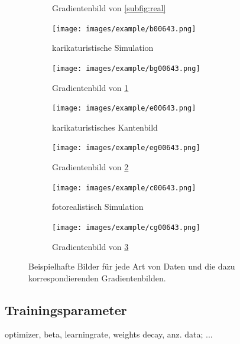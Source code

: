 \begin{figure}[htp]
\begin{subfigure}[b]{0.48\linewidth}
		\caption{Gradientenbild von \ref{subfig:real}}
	\end{subfigure}
	\hfill
	\begin{subfigure}[b]{0.48\linewidth}
		\centering
		\texttt{[image: images/example/b00643.png]}
		\caption{karikaturistische Simulation}
		\label{subfig:cartoonish}
	\end{subfigure}
	\hfill
	\begin{subfigure}[b]{0.48\linewidth}
		\centering
		\texttt{[image: images/example/bg00643.png]}
		\caption{Gradientenbild von \ref{subfig:cartoonish}}
	\end{subfigure}
	\hfill
	\begin{subfigure}[b]{0.48\linewidth}
		\centering
		\texttt{[image: images/example/e00643.png]}
		\caption{karikaturistisches Kantenbild}
		\label{subfig:edge}
	\end{subfigure}
	\hfill
	\begin{subfigure}[b]{0.48\linewidth}
		\centering
		\texttt{[image: images/example/eg00643.png]}
		\caption{Gradientenbild von \ref{subfig:edge}}
	\end{subfigure}
	\hfill
	\begin{subfigure}[b]{0.48\linewidth}
		\centering
		\texttt{[image: images/example/c00643.png]}
		\caption{fotorealistisch Simulation}
		\label{subfig:photorealistic}
	\end{subfigure}
	\hfill
	\begin{subfigure}[b]{0.48\linewidth}
		\centering
		\texttt{[image: images/example/cg00643.png]}
		\caption{Gradientenbild von \ref{subfig:photorealistic}}
	\end{subfigure}
	\caption{Beispielhafte Bilder für jede Art von Daten und die dazu korrespondierenden Gradientenbilden.}
	\label{fig:dataset_preprocess}
\end{figure}
\vspace{\fill}

\subsection{Trainingsparameter}
optimizer, beta,
learningrate,
weights decay, anz. data; ...